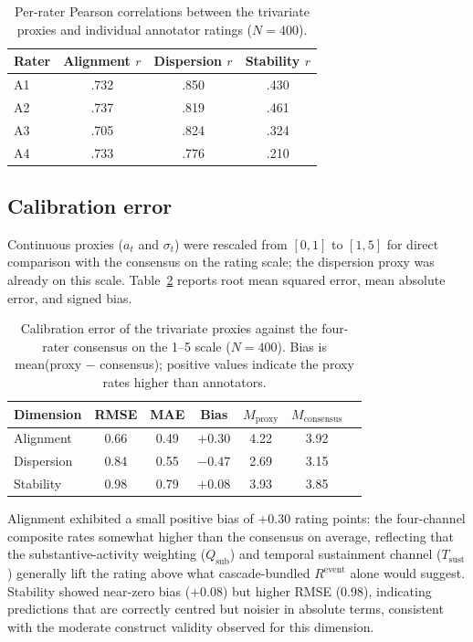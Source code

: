 \documentclass[preprint,12pt,authoryear]{elsarticle}
\begin{document}
\begin{table}[h]
\centering
\caption{Per-rater Pearson correlations between the trivariate proxies and individual annotator ratings ($N = 400$).}
\label{tab:per_rater_validity}
\begin{tabular}{lccc}
\hline
Rater & Alignment $r$ & Dispersion $r$ & Stability $r$ \\
\hline
A1 & .732 & .850 & .430 \\
A2 & .737 & .819 & .461 \\
A3 & .705 & .824 & .324 \\
A4 & .733 & .776 & .210 \\
\hline
\end{tabular}
\end{table}

\subsection{Calibration error}
\label{sec:results-calibration}

Continuous proxies ($a_t$ and $\sigma_t$) were rescaled from $[0, 1]$ to $[1, 5]$ for direct comparison with the consensus on the rating scale; the dispersion proxy was already on this scale. Table~\ref{tab:calibration} reports root mean squared error, mean absolute error, and signed bias.

\begin{table}[h]
\centering
\caption{Calibration error of the trivariate proxies against the four-rater consensus on the 1--5 scale ($N = 400$). Bias is mean(proxy $-$ consensus); positive values indicate the proxy rates higher than annotators.}
\label{tab:calibration}
\begin{tabular}{lcccccc}
\hline
Dimension & RMSE & MAE & Bias & $M_{\mathrm{proxy}}$ & $M_{\mathrm{consensus}}$ \\
\hline
Alignment & 0.66 & 0.49 & $+0.30$ & 4.22 & 3.92 \\
Dispersion & 0.84 & 0.55 & $-0.47$ & 2.69 & 3.15 \\
Stability & 0.98 & 0.79 & $+0.08$ & 3.93 & 3.85 \\
\hline
\end{tabular}
\end{table}

Alignment exhibited a small positive bias of $+0.30$ rating points: the four-channel composite rates somewhat higher than the consensus on average, reflecting that the substantive-activity weighting ($Q_{\mathrm{sub}}$) and temporal sustainment channel ($T_{\mathrm{sust}}$) generally lift the rating above what cascade-bundled $R^{\mathrm{event}}$ alone would suggest. Stability showed near-zero bias ($+0.08$) but higher RMSE (0.98), indicating predictions that are correctly centred but noisier in absolute terms, consistent with the moderate construct validity observed for this dimension.
\end{document}
